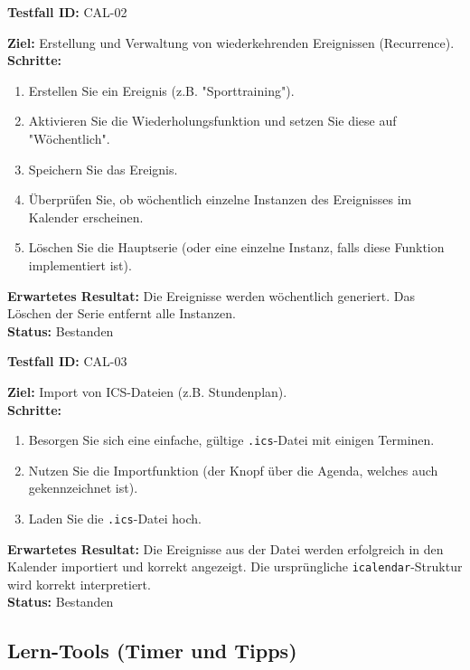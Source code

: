 \documentclass[11pt, a4paper]{article}
\newenvironment{testcase}[1]{%
    \par\vspace{1em}\noindent\begin{minipage}{\linewidth}
    \textbf{Testfall ID:} #1 \\
    \vspace{0.2em}
}{\end{minipage}\par\vspace{1em}}
\begin{document}
\begin{testcase}{CAL-02}
    \textbf{Ziel:} Erstellung und Verwaltung von wiederkehrenden Ereignissen (Recurrence).\\
    \textbf{Schritte:}
    \begin{enumerate}[label=\arabic*.]
        \item Erstellen Sie ein Ereignis (z.B. "Sporttraining").
        \item Aktivieren Sie die Wiederholungsfunktion und setzen Sie diese auf "Wöchentlich".
        \item Speichern Sie das Ereignis.
        \item Überprüfen Sie, ob wöchentlich einzelne Instanzen des Ereignisses im Kalender erscheinen.
        \item Löschen Sie die Hauptserie (oder eine einzelne Instanz, falls diese Funktion implementiert ist).
    \end{enumerate}
    \textbf{Erwartetes Resultat:} Die Ereignisse werden wöchentlich generiert. Das Löschen der Serie entfernt alle Instanzen.\\
    \vspace{0.5em}\textbf{Status:} \textcolor{passcolor}{Bestanden}
\end{testcase}

\begin{testcase}{CAL-03}
    \textbf{Ziel:} Import von ICS-Dateien (z.B. Stundenplan).\\
    \textbf{Schritte:}
    \begin{enumerate}[label=\arabic*.]
        \item Besorgen Sie sich eine einfache, gültige \texttt{.ics}-Datei mit einigen Terminen.
        \item Nutzen Sie die Importfunktion (der Knopf über die Agenda, welches auch gekennzeichnet ist).
        \item Laden Sie die \texttt{.ics}-Datei hoch.
    \end{enumerate}
    \textbf{Erwartetes Resultat:} Die Ereignisse aus der Datei werden erfolgreich in den Kalender importiert und korrekt angezeigt. Die ursprüngliche \texttt{icalendar}-Struktur wird korrekt interpretiert.\\
    \vspace{0.5em}\textbf{Status:} \textcolor{passcolor}{Bestanden}
\end{testcase}

\subsection{Lern-Tools (Timer und Tipps)}
\end{document}
